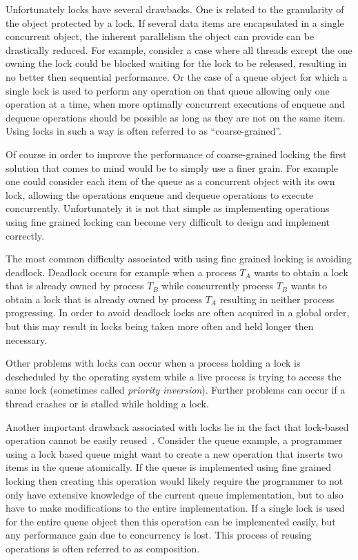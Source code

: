 Unfortunately locks have several drawbacks. One is related to the  granularity
of the object protected by a lock. If several data items 
are encapsulated  in a single  concurrent  object, the
inherent parallelism  the object can provide 
can be drastically reduced.
For example, consider a case where all threads except the one owning the lock could be blocked waiting
for the lock to be released, resulting in no better then sequential performance.
Or the case of a queue 
object for which a single lock is used to perform any operation on that queue
allowing only one operation at a time, when more optimally
concurrent executions of enqueue and dequeue operations 
should be possible as long as they are not on the same item.
Using locks in such a way is often referred to as ``coarse-grained''.


Of course in order to improve the performance of coarse-grained locking
the first solution that comes to mind would be to simply
use a finer grain.  For example one could consider
each item of the queue as  a concurrent object with its own lock,
allowing the  operations  enqueue  
and  dequeue  operations to execute concurrently.
Unfortunately it is not that simple as implementing operations using
fine grained locking can  become very   difficult  to  design and implement
correctly.

The most common difficulty associated with using fine grained locking
is avoiding deadlock.
Deadlock occurs for example when a process $T_A$ wants to obtain a lock that
is already owned by process $T_B$ while concurrently process $T_B$ wants
to obtain a lock that is already owned by process $T_A$ resulting
in neither process progressing.
In order to avoid deadlock locks are often acquired in a global order,
but this may result in locks being taken more often and held longer then necessary.

Other problems with locks can occur when a process holding a lock
is descheduled by the operating system while a live process is trying to
access the same lock (sometimes called \emph{priority inversion}).
Further problems can occur if a thread crashes or is stalled while
holding a lock.

Another important drawback associated with locks lie in the fact that 
lock-based operation cannot be easily reused~\cite{HMPH05,GG11}.
Consider the queue example, a programmer using a lock based queue
might want to create a new operation that inserts two items in the queue
atomically.
If the queue is implemented using fine grained locking then creating this operation
would likely require the programmer to not only have extensive knowledge of the current
queue implementation, but to also have to make modifications to the entire implementation.
If a single lock is used for the entire queue object then this operation can be implemented
easily, but any performance gain due to concurrency is lost.
This process of reusing operations is often referred to as composition.


